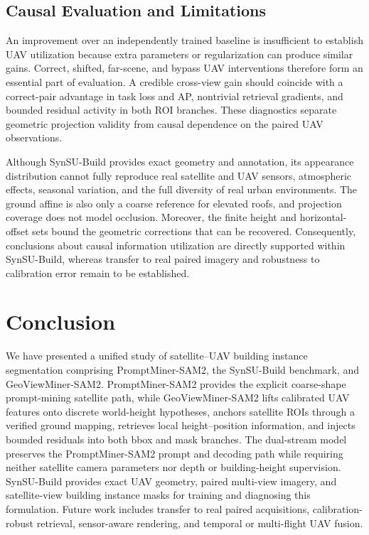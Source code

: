 \documentclass[letterpaper,journal]{IEEEtran}
\begin{document}
\subsection{Causal Evaluation and Limitations}
An improvement over an independently trained baseline is insufficient to establish UAV utilization because extra parameters or regularization can produce similar gains. Correct, shifted, far-scene, and bypass UAV interventions therefore form an essential part of evaluation. A credible cross-view gain should coincide with a correct-pair advantage in task loss and AP, nontrivial retrieval gradients, and bounded residual activity in both ROI branches. These diagnostics separate geometric projection validity from causal dependence on the paired UAV observations.

Although SynSU-Build provides exact geometry and annotation, its appearance distribution cannot fully reproduce real satellite and UAV sensors, atmospheric effects, seasonal variation, and the full diversity of real urban environments. The ground affine is also only a coarse reference for elevated roofs, and projection coverage does not model occlusion. Moreover, the finite height and horizontal-offset sets bound the geometric corrections that can be recovered. Consequently, conclusions about causal information utilization are directly supported within SynSU-Build, whereas transfer to real paired imagery and robustness to calibration error remain to be established.

\section{Conclusion}
\label{sec:conclusion}
We have presented a unified study of satellite--UAV building instance segmentation comprising PromptMiner-SAM2, the SynSU-Build benchmark, and GeoViewMiner-SAM2. PromptMiner-SAM2 provides the explicit coarse-shape prompt-mining satellite path, while GeoViewMiner-SAM2 lifts calibrated UAV features onto discrete world-height hypotheses, anchors satellite ROIs through a verified ground mapping, retrieves local height--position information, and injects bounded residuals into both bbox and mask branches. The dual-stream model preserves the PromptMiner-SAM2 prompt and decoding path while requiring neither satellite camera parameters nor depth or building-height supervision. SynSU-Build provides exact UAV geometry, paired multi-view imagery, and satellite-view building instance masks for training and diagnosing this formulation. Future work includes transfer to real paired acquisitions, calibration-robust retrieval, sensor-aware rendering, and temporal or multi-flight UAV fusion.
\end{document}
